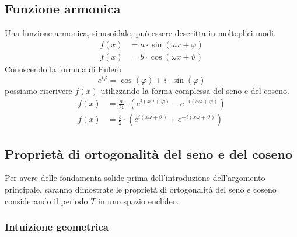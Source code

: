 \subsection{Funzione armonica}
Una funzione armonica, sinusoidale, pu\`o essere descritta in molteplici modi.
\begin{align*}
    f(x) &= a\cdot\sin (\omega x + \varphi) \\
    f(x) &= b\cdot\cos(\omega x + \vartheta)
\end{align*}
Conoscendo la formula di Eulero 
\[
    e^{i\varphi} = \cos(\varphi) + i\cdot\sin(\varphi)
\]
possiamo riscrivere \(f(x)\) utilizzando la forma complessa del seno e del coseno.
\begin{align*}
    f(x) &= \frac{a}{2i}\cdot(e^{i(x\omega + \varphi)} - e^{-i(x\omega + \varphi)}) \\
    f(x) &= \frac{b}{2}\cdot(e^{i(x\omega + \vartheta)} + e^{-i(x\omega + \vartheta)})
\end{align*}

\subsection{Propriet\`a di ortogonalit\`a del seno e del coseno}
Per avere delle fondamenta solide prima dell'introduzione dell'argomento
principale, saranno dimostrate le propriet\`a di ortogonalit\`a del seno e
coseno considerando il periodo \(T\) in uno spazio euclideo.

\subsubsection{Intuizione geometrica}

